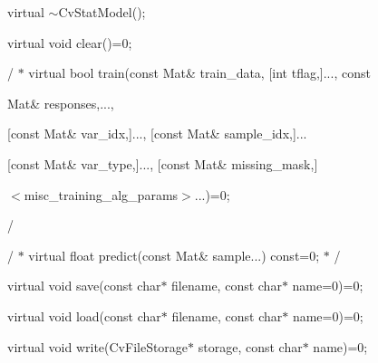 {\ttfamily }

{\ttfamily virtual $\sim$\+Cv\+Stat\+Model();}

{\ttfamily }

{\ttfamily }

{\ttfamily virtual void clear()=0;}

{\ttfamily }

{\ttfamily }

{\ttfamily / $\ast$ virtual bool train(const Mat\& train\+\_\+data, \mbox{[}int tflag,\mbox{]}..., const}

{\ttfamily }

{\ttfamily }

{\ttfamily Mat\& responses,...,}

{\ttfamily }

{\ttfamily }

{\ttfamily \mbox{[}const Mat\& var\+\_\+idx,\mbox{]}..., \mbox{[}const Mat\& sample\+\_\+idx,\mbox{]}...}

{\ttfamily }

{\ttfamily }

{\ttfamily \mbox{[}const Mat\& var\+\_\+type,\mbox{]}..., \mbox{[}const Mat\& missing\+\_\+mask,\mbox{]}}

{\ttfamily }

{\ttfamily }

{\ttfamily $<$misc\+\_\+training\+\_\+alg\+\_\+params$>$...)=0;}

{\ttfamily  
\begin{DoxyItemize}
\item / 
\end{DoxyItemize}}

{\ttfamily }

{\ttfamily / $\ast$ virtual float predict(const Mat\& sample...) const=0; $\ast$ /}

{\ttfamily }

{\ttfamily }

{\ttfamily virtual void save(const char$\ast$ filename, const char$\ast$ name=0)=0;}

{\ttfamily }

{\ttfamily }

{\ttfamily virtual void load(const char$\ast$ filename, const char$\ast$ name=0)=0;}

{\ttfamily }

{\ttfamily }

{\ttfamily virtual void write(\+Cv\+File\+Storage$\ast$ storage, const char$\ast$ name)=0;}

{\ttfamily }

